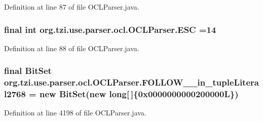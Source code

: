 Definition at line 87 of file O\-C\-L\-Parser.\-java.

\hypertarget{classorg_1_1tzi_1_1use_1_1parser_1_1ocl_1_1_o_c_l_parser_aa338d23fc9eb5f8492d36b8ed57a2f25}{
\subsubsection[{E\-S\-C}]{\setlength{\rightskip}{0pt plus 5cm}final int org.\-tzi.\-use.\-parser.\-ocl.\-O\-C\-L\-Parser.\-E\-S\-C =14\hspace{0.3cm}{\ttfamily [static]}}}\label{classorg_1_1tzi_1_1use_1_1parser_1_1ocl_1_1_o_c_l_parser_aa338d23fc9eb5f8492d36b8ed57a2f25}


Definition at line 88 of file O\-C\-L\-Parser.\-java.

\hypertarget{classorg_1_1tzi_1_1use_1_1parser_1_1ocl_1_1_o_c_l_parser_a9d095518b8ffb61a07505dce6dfa249b}{
\subsubsection[{F\-O\-L\-L\-O\-W\-\_\-49\-\_\-in\-\_\-tuple\-Literal2768}]{\setlength{\rightskip}{0pt plus 5cm}final Bit\-Set org.\-tzi.\-use.\-parser.\-ocl.\-O\-C\-L\-Parser.\-F\-O\-L\-L\-O\-W\-\_\-\_\-in\-\_\-tuple\-Literal2768 = new Bit\-Set(new long\mbox{[}$\,$\mbox{]}\{0x0000000000200000\-L\})\hspace{0.3cm}{\ttfamily [static]}}}\label{classorg_1_1tzi_1_1use_1_1parser_1_1ocl_1_1_o_c_l_parser_a9d095518b8ffb61a07505dce6dfa249b}


Definition at line 4198 of file O\-C\-L\-Parser.\-java.

